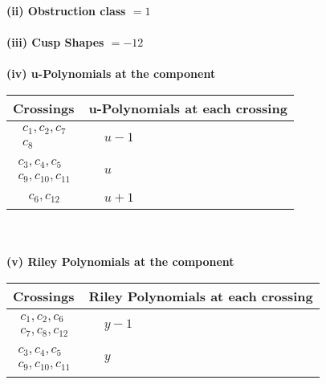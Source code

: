 \documentclass[1p]{elsarticle_modified}
\theoremstyle{definition}
\begin{document}
\flushleft \textbf{(ii) Obstruction class $= 1$}\\~\\
\flushleft \textbf{(iii) Cusp Shapes $= -12$}\\~\\
\newpage\renewcommand{\arraystretch}{1}
\flushleft \textbf{(iv) u-Polynomials at the component}\newline \\
\begin{tabular}{m{50pt}|m{274pt}}
Crossings & \hspace{64pt}u-Polynomials at each crossing \\
\hline $$\begin{aligned}c_{1},c_{2},c_{7}\\c_{8}\end{aligned}$$&$\begin{aligned}
&u-1
\end{aligned}$\\
\hline $$\begin{aligned}c_{3},c_{4},c_{5}\\c_{9},c_{10},c_{11}\end{aligned}$$&$\begin{aligned}
&u
\end{aligned}$\\
\hline $$\begin{aligned}c_{6},c_{12}\end{aligned}$$&$\begin{aligned}
&u+1
\end{aligned}$\\
\hline
\end{tabular}\\~\\
\newpage\renewcommand{\arraystretch}{1}
\flushleft \textbf{(v) Riley Polynomials at the component}\newline \\
\begin{tabular}{m{50pt}|m{274pt}}
Crossings & \hspace{64pt}Riley Polynomials at each crossing \\
\hline $$\begin{aligned}c_{1},c_{2},c_{6}\\c_{7},c_{8},c_{12}\end{aligned}$$&$\begin{aligned}
&y-1
\end{aligned}$\\
\hline $$\begin{aligned}c_{3},c_{4},c_{5}\\c_{9},c_{10},c_{11}\end{aligned}$$&$\begin{aligned}
&y
\end{aligned}$\\
\hline
\end{tabular}\\~\\
\end{document}
